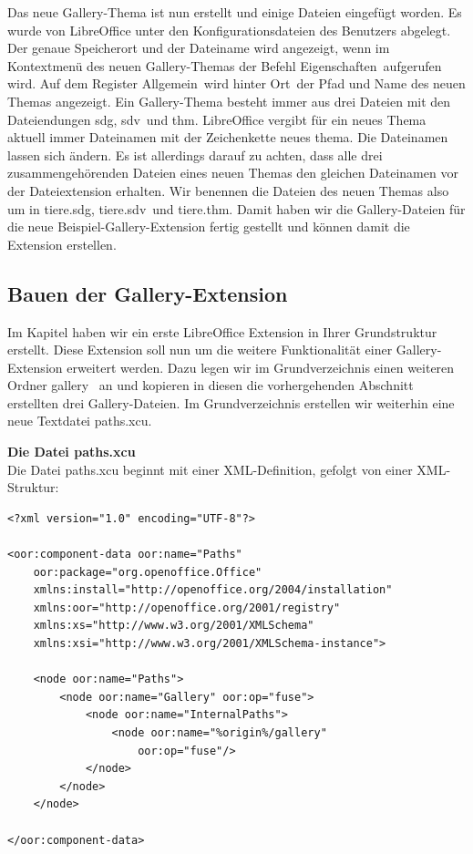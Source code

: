 \documentclass[a4paper,10pt,pagesize,titlepage]{scrbook}
\begin{document}
Das neue Gallery-Thema ist nun erstellt und einige Dateien eingefügt worden. Es wurde von LibreOffice unter den Konfigurationsdateien des Benutzers abgelegt. Der genaue Speicherort und der Dateiname wird angezeigt, wenn im Kontextmenü des neuen Gallery-Themas der Befehl \glqq Eigenschaften\grqq~aufgerufen wird. Auf dem Register \glqq Allgemein\grqq~wird hinter \glqq Ort\grqq~der Pfad und Name des neuen Themas angezeigt. Ein Gallery-Thema besteht immer aus drei Dateien mit den Dateiendungen \glqq sdg\grqq, \glqq sdv\grqq~und \glqq thm\grqq. LibreOffice vergibt für ein neues Thema aktuell immer Dateinamen mit der Zeichenkette \glqq neues thema\grqq. Die Dateinamen lassen sich ändern. Es ist allerdings darauf zu achten, dass alle drei zusammengehörenden Dateien eines neuen Themas den gleichen Dateinamen vor der Dateiextension erhalten. Wir benennen die Dateien des neuen Themas also um in \glqq tiere.sdg\grqq, \glqq tiere.sdv\grqq~und \glqq tiere.thm\grqq. Damit haben wir die Gallery-Dateien für die neue Beispiel-Gallery-Extension fertig gestellt und können damit die Extension erstellen.

\subsection{Bauen der Gallery-Extension}

Im Kapitel  haben wir ein erste LibreOffice Extension in Ihrer Grundstruktur erstellt. Diese Extension soll nun um die weitere Funktionalität einer Gallery-Extension erweitert werden. Dazu legen wir im Grundverzeichnis einen weiteren Ordner \glqq gallery\grqq~ an und kopieren in diesen die vorhergehenden Abschnitt erstellten drei Gallery-Dateien. Im Grundverzeichnis erstellen wir weiterhin eine neue Textdatei \glqq paths.xcu\grqq.

\bigskip\textbf{Die Datei paths.xcu}
\\

Die Datei paths.xcu beginnt mit einer XML-Definition, gefolgt von einer XML-Struktur:

\begin{lstlisting}
<?xml version="1.0" encoding="UTF-8"?>

<oor:component-data oor:name="Paths" 
    oor:package="org.openoffice.Office" 
    xmlns:install="http://openoffice.org/2004/installation" 
    xmlns:oor="http://openoffice.org/2001/registry"
    xmlns:xs="http://www.w3.org/2001/XMLSchema" 
    xmlns:xsi="http://www.w3.org/2001/XMLSchema-instance">
    
    <node oor:name="Paths">
        <node oor:name="Gallery" oor:op="fuse">
    	    <node oor:name="InternalPaths">
    	        <node oor:name="%origin%/gallery" 
    	            oor:op="fuse"/>
    	    </node>
    	</node>
    </node>
    
</oor:component-data>
\end{lstlisting}
\end{document}
